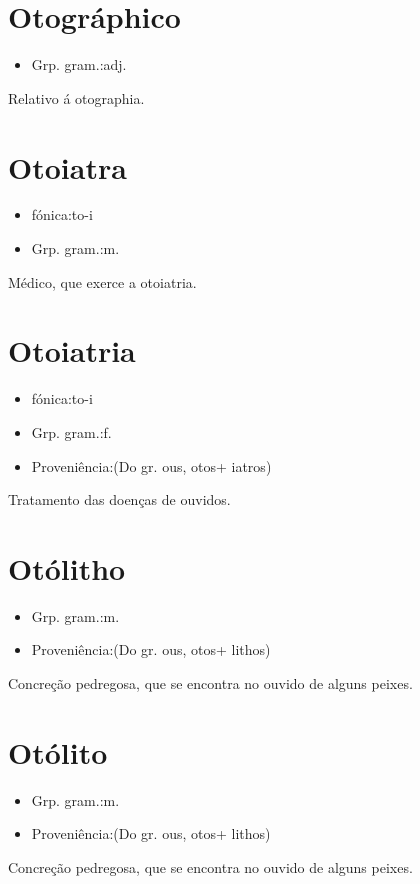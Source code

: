 \section{Otográphico}
\begin{itemize}
\item {Grp. gram.:adj.}
\end{itemize}
Relativo á otographia.
\section{Otoiatra}
\begin{itemize}
\item {fónica:to-i}
\end{itemize}
\begin{itemize}
\item {Grp. gram.:m.}
\end{itemize}
Médico, que exerce a otoiatria.
\section{Otoiatria}
\begin{itemize}
\item {fónica:to-i}
\end{itemize}
\begin{itemize}
\item {Grp. gram.:f.}
\end{itemize}
\begin{itemize}
\item {Proveniência:(Do gr. \textunderscore ous\textunderscore , \textunderscore otos\textunderscore  + \textunderscore iatros\textunderscore )}
\end{itemize}
Tratamento das doenças de ouvidos.
\section{Otólitho}
\begin{itemize}
\item {Grp. gram.:m.}
\end{itemize}
\begin{itemize}
\item {Proveniência:(Do gr. \textunderscore ous\textunderscore , \textunderscore otos\textunderscore  + \textunderscore lithos\textunderscore )}
\end{itemize}
Concreção pedregosa, que se encontra no ouvido de alguns peixes.
\section{Otólito}
\begin{itemize}
\item {Grp. gram.:m.}
\end{itemize}
\begin{itemize}
\item {Proveniência:(Do gr. \textunderscore ous\textunderscore , \textunderscore otos\textunderscore  + \textunderscore lithos\textunderscore )}
\end{itemize}
Concreção pedregosa, que se encontra no ouvido de alguns peixes.
